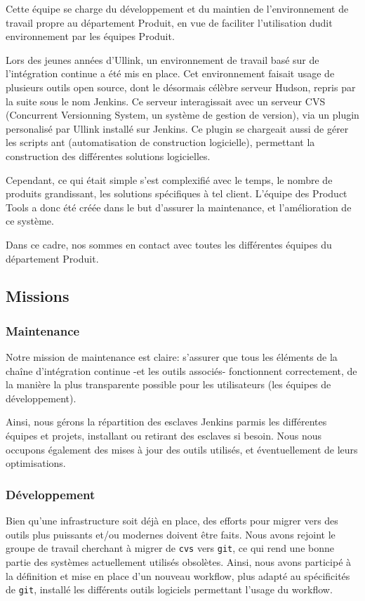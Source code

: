 \documentclass[a4paper, 12pt]{article}
\newcommand{\git}{\texttt{git}}
\begin{document}
Cette équipe se charge du développement et du maintien de l'environnement de travail propre au département Produit, en vue de faciliter l'utilisation dudit environnement par les équipes Produit.

Lors des jeunes années d'Ullink, un environnement de travail basé sur de l'intégration continue a été mis en place. Cet environnement faisait usage de plusieurs outils open source, dont le désormais célèbre serveur Hudson, repris par la suite sous le nom Jenkins. Ce serveur interagissait avec un serveur CVS (Concurrent Versionning System, un système de gestion de version), via un plugin personalisé par Ullink installé sur Jenkins. Ce plugin se chargeait aussi de gérer les scripts ant (automatisation de construction logicielle), permettant la construction des différentes solutions logicielles.

Cependant, ce qui était simple s'est complexifié avec le temps, le nombre de produits grandissant, les solutions spécifiques à tel client. L'équipe des Product Tools a donc été créée dans le but d'assurer la maintenance, et l'amélioration de ce système.

Dans ce cadre, nos sommes en contact avec toutes les différentes équipes du département Produit.

\subsection{Missions}
\subsubsection{Maintenance}

Notre mission de maintenance est claire: s'assurer que tous les éléments de la chaîne d'intégration continue -et les outils associés- fonctionnent correctement, de la manière la plus transparente possible pour les utilisateurs (les équipes de développement).

Ainsi, nous gérons la répartition des esclaves Jenkins parmis les différentes équipes et projets, installant ou retirant des esclaves si besoin. Nous nous occupons également des mises à jour des outils utilisés, et éventuellement de leurs optimisations.

\subsubsection{Développement}

Bien qu'une infrastructure soit déjà en place, des efforts pour migrer vers des outils plus puissants et/ou modernes doivent être faits. Nous avons rejoint le groupe de travail cherchant à migrer de \texttt{cvs} vers \git, ce qui rend une bonne partie des systèmes actuellement utilisés obsolètes. Ainsi, nous avons participé à la définition et mise en place d'un nouveau workflow, plus adapté au spécificités de \git, installé les différents outils logiciels permettant l'usage du workflow.
\end{document}
